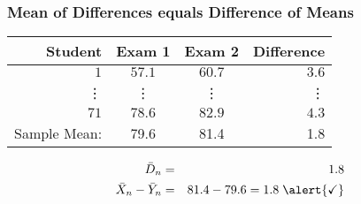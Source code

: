 \begin{frame}
  \frametitle{Mean of Differences equals Difference of Means}

\small

%
%
\begin{table}[!tbp]
\begin{center}
\begin{tabular}{rccr}
\hline\hline
\multicolumn{1}{r}{Student}&\multicolumn{1}{c}{Exam 1}&\multicolumn{1}{c}{Exam 2}&\multicolumn{1}{r}{Difference}\tabularnewline
\hline
$ 1$&$57.1$&$60.7$&$  3.6$\tabularnewline
\vdots&\vdots&\vdots&\vdots\\
$71$&$78.6$&$82.9$&$  4.3$\tabularnewline
\hline
Sample Mean: & 79.6 & 81.4  &1.8\\
\hline
\end{tabular}
\end{center}
\end{table}


\begin{eqnarray*}
	\bar{D}_n &=& 1.8\\ 
	\bar{X}_n - \bar{Y}_n &=&  81.4 - 79.6 =   1.8  \;\alert{\checkmark}
\end{eqnarray*}

\end{frame}


